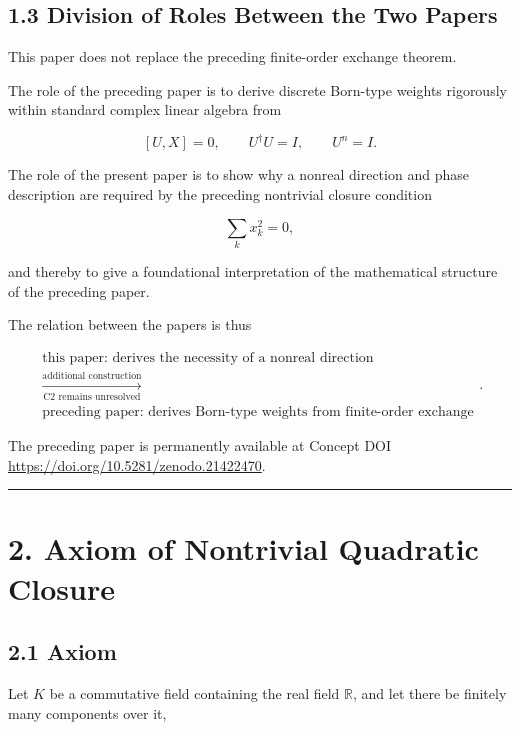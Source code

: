 \documentclass[
  a4paper,
  10pt]{article}
\begin{document}
\subsection{1.3 Division of Roles Between the Two
Papers}\label{13-division-of-roles-between-the-two-papers}

This paper does not replace the preceding finite-order exchange theorem.

The role of the preceding paper is to derive discrete Born-type weights
rigorously within standard complex linear algebra from

\[
[U,X]=0,
\qquad
U^\dagger U=I,
\qquad
U^n=I.
\]

The role of the present paper is to show why a nonreal direction and
phase description are required by the preceding nontrivial closure
condition

\[
\sum_kx_k^2=0,
\]

and thereby to give a foundational interpretation of the mathematical
structure of the preceding paper.

The relation between the papers is thus

\[
\boxed{
\begin{gathered}
\text{this paper: derives the necessity of a nonreal direction}\\
\xrightarrow[\text{C2 remains unresolved}]{\text{additional construction}}\\
\text{preceding paper: derives Born-type weights from finite-order exchange}
\end{gathered}
}.
\]

The preceding paper is permanently available at Concept DOI
\url{https://doi.org/10.5281/zenodo.21422470}.

\begin{center}\rule{0.5\linewidth}{0.5pt}\end{center}

\section{2. Axiom of Nontrivial Quadratic
Closure}\label{2-axiom-of-nontrivial-quadratic-closure}

\subsection{2.1 Axiom}\label{21-axiom}

Let \(K\) be a commutative field containing the real field
\(\mathbb R\), and let there be finitely many components over it,
\end{document}
